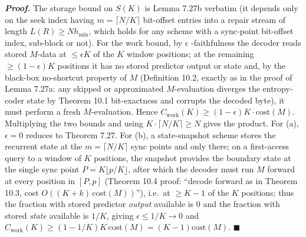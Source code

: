 \documentclass[
]{article}
\begin{document}
\emph{\textbf{Proof.}} The storage bound on $S(K)$ is Lemma 7.27b
verbatim (it depends only on the seek index having $m = \lceil N/K
\rceil$ bit-offset entries into a repair stream of length $L(R) \geq N
h_{\min}$, which holds for any scheme with a sync-point bit-offset
index, sub-block or not). For the work bound, by $\epsilon$
-faithfulness the decoder reads stored $M$-data at $\leq \epsilon K$ of
the $K$ window positions; at the remaining $\geq (1-\epsilon)K$
positions it has no stored predictor output or state and, by the
black-box no-shortcut property of $M$ (Definition 10.2, exactly as in
the proof of Lemma 7.27a: any skipped or approximated $M$-evaluation
diverges the entropy-coder state by Theorem 10.1 bit-exactness and
corrupts the decoded byte), it must perform a fresh $M$-evaluation.
Hence $C_{\mathrm{work}}(K) \geq (1-\epsilon) K \cdot \mathrm{cost}(M)$.
Multiplying the two bounds and using $K \cdot \lceil N/K \rceil \geq N$
gives the product. For (a), $\epsilon = 0$ reduces to Theorem 7.27. For
(b), a state-snapshot scheme stores the recurrent state at the $m =
\lceil N/K \rceil$ sync points and only there; on a first-access query
to a window of $K$ positions, the snapshot provides the boundary state
at the single sync point $P = K\lfloor p/K\rfloor$, after which the
decoder must run $M$ forward at every position in $[P, p]$ (Theorem
10.4 proof: ``decode forward as in Theorem 10.3, cost $O((K+k)\,
\mathrm{cost}(M))$''), i.e.\ at $\geq K - 1$ of the $K$ positions; thus
the fraction with stored predictor \emph{output} available is $0$ and
the fraction with stored \emph{state} available is $1/K$, giving
$\epsilon \leq 1/K \to 0$ and $C_{\mathrm{work}}(K) \geq (1 - 1/K) K\,
\mathrm{cost}(M) = (K-1)\mathrm{cost}(M)$. \hfill$\blacksquare$
\end{document}
